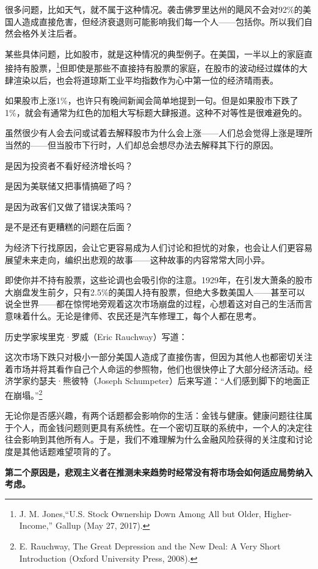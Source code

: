 很多问题，比如天气，就不属于这种情况。袭击佛罗里达州的飓风不会对92\%的美国人造成直接危害，但经济衰退则可能影响我们每一个人——包括你。所以我们自然会格外关注后者。

某些具体问题，比如股市，就是这种情况的典型例子。在美国，一半以上的家庭直接持有股票，\footnote{J. M. Jones,“U.S. Stock Ownership Down Among All but Older, Higher-Income,” Gallup (May 27, 2017).}但即使是那些不直接持有股票的家庭，在股市的波动经过媒体的大肆渲染以后，也会将道琼斯工业平均指数作为心中第一位的经济晴雨表。

如果股市上涨1\%，也许只有晚间新闻会简单地提到一句。但是如果股市下跌了1\%，就会有通常为红色的加粗大写标题大肆报道。这种不对等性是很难避免的。

虽然很少有人会去问或试着去解释股市为什么会上涨——人们总会觉得上涨是理所当然的——但当股市下行时，人们却总会想尽办法去解释其下行的原因。

是因为投资者不看好经济增长吗？

是因为美联储又把事情搞砸了吗？

是因为政客们又做了错误决策吗？

是不是还有更糟糕的问题在后面？

为经济下行找原因，会让它更容易成为人们讨论和担忧的对象，也会让人们更容易展望未来走向，编织出悲观的故事——这种故事的内容常常大同小异。

即使你并不持有股票，这些论调也会吸引你的注意。1929年，在引发大萧条的股市大崩盘发生前夕，只有2.5\%的美国人持有股票，但绝大多数美国人——甚至可以说全世界——都在惊愕地旁观着这次市场崩盘的过程，心想着这对自己的生活而言意味着什么。无论是律师、农民还是汽车修理工，每个人都在思考。

历史学家埃里克·罗威（Eric Rauchway）写道：

{\kaishu

这次市场下跌只对极小一部分美国人造成了直接伤害，但因为其他人也都密切关注着市场并将其看作自己个人命运的参照物，他们也很快停止了大部分经济活动。经济学家约瑟夫·熊彼特（Joseph Schumpeter）后来写道：“人们感到脚下的地面正在崩塌。”\footnote{E. Rauchway, The Great Depression and the New Deal: A Very Short Introduction (Oxford University Press, 2008).}

}

无论你是否感兴趣，有两个话题都会影响你的生活：金钱与健康。健康问题往往属于个人，而金钱问题则更具有系统性。在一个密切互联的系统中，一个人的决定往往会影响到其他所有人。于是，我们不难理解为什么金融风险获得的关注度和讨论度是其他话题难望项背的了。

\textbf{第二个原因是，悲观主义者在推测未来趋势时经常没有将市场会如何适应局势纳入考虑。}


